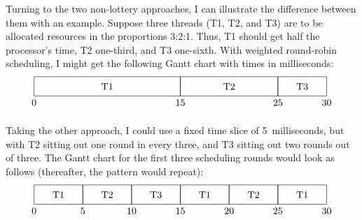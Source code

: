 Turning to the two non-lottery approaches, I can
illustrate the difference between them with an example.  Suppose
three threads (T1, T2, and T3) are to be allocated
resources in the proportions 3:2:1.  Thus, T1 should get half the
processor's time, T2 one-third, and T3 one-sixth.  With
weighted round-robin scheduling, I might
get the following Gantt chart with times in milliseconds:
\[\begin{tikzpicture}[scale=.035]
\draw (0,0) rectangle (150,20);
\draw (150,0) rectangle (250,20);
\draw (250,0) rectangle (300,20);
\draw (75,10) node{T1};
\draw (200,10) node{T2};
\draw (275,10) node{T3};
\draw (0,-7) node{0};
\draw (150,-7) node{15};
\draw (250,-7) node{25};
\draw (300,-7) node{30};
\end{tikzpicture}\]

Taking the other approach, I could use a fixed time slice of
5~milliseconds, but with T2 sitting out one round in every three, and
T3 sitting out two rounds out of three.  The Gantt chart for the first
three scheduling rounds would look as follows (thereafter, the pattern
would repeat):
\[\begin{tikzpicture}[scale=.035]
\draw (0,0) rectangle (50,20);
\draw (50,0) rectangle (100,20);
\draw (100,0) rectangle (150,20);
\draw (150,0) rectangle (200,20);
\draw (200,0) rectangle (250,20);
\draw (250,0) rectangle (300,20);
\draw (25,10) node{T1};
\draw (75,10) node{T2};
\draw (125,10) node{T3};
\draw (175,10) node{T1};
\draw (225,10) node{T2};
\draw (275,10) node{T1};
\draw (0,-7) node{0};
\draw (50,-7) node{5};
\draw (100,-7) node{10};
\draw (150,-7) node{15};
\draw (200,-7) node{20};
\draw (250,-7) node{25};
\draw (300,-7) node{30};
\end{tikzpicture}\]

